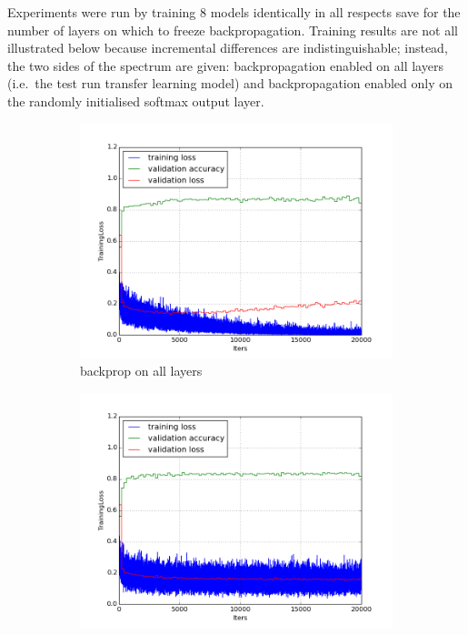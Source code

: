 \documentclass[a4paper,11pt]{article}
\begin{document}
Experiments were run by training 8 models identically in all respects save for the number of layers on which to freeze backpropagation. Training results are not all illustrated below because incremental differences are indistinguishable; instead, the two sides of the spectrum are given: backpropagation enabled on all layers (i.e.\ the test run transfer learning model) and backpropagation enabled only on the randomly initialised softmax output layer. 

\begin{figure}
    \centering
    \begin{minipage}[b]{\textwidth}
      \begin{subfigure}{.5\textwidth} 
        \centering
        \includegraphics[scale=0.4]{images/plot_clampdet_none.png}
        \caption{backprop on all layers}\label{fig:2a}
      \end{subfigure}%
      \begin{subfigure}{.5\textwidth} 
        \centering
        \includegraphics[scale=0.4]{images/plot_clampdet_fc7.png}

\end{subfigure}
\end{minipage}
\end{figure}
\end{document}
